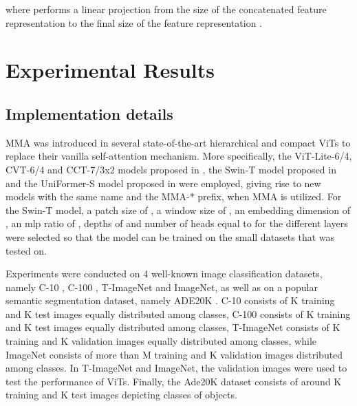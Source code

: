 \documentclass[10pt,twocolumn,letterpaper]{article}
\begin{document}
where  performs a linear projection from the size of the concatenated feature representation  to the final size of the feature representation .

\section{Experimental Results}
\label{sec:results}

\subsection{Implementation details}

MMA was introduced in several state-of-the-art hierarchical and compact ViTs to replace their vanilla self-attention mechanism. More specifically, the ViT-Lite-6/4, CVT-6/4 and CCT-7/3x2 models proposed in \cite{Author1}, the Swin-T model proposed in \cite{Author9} and the UniFormer-S model proposed in \cite{Author57} were employed, giving rise to new models with the same name and the MMA-* prefix, when MMA is utilized. For the Swin-T model, a patch size of , a window size of , an embedding dimension of , an mlp ratio of , depths of  and number of heads equal to  for the different layers were selected so that the model can be trained on the small datasets that was tested on. 

Experiments were conducted on 4 well-known image classification datasets, namely C-10 \cite{Author38}, C-100 \cite{Author38}, T-ImageNet \cite{Author40} and ImageNet, as well as on a popular semantic segmentation dataset, namely ADE20K \cite{Author59, Author60}. C-10 consists of K training and K test images equally distributed among  classes, C-100 consists of K training and K test images equally distributed among  classes, T-ImageNet consists of K training and K validation images equally distributed among  classes, while ImageNet consists of more than M training and K validation images distributed among  classes. In T-ImageNet and ImageNet, the validation images were used to test the performance of ViTs. Finally, the Ade20K dataset consists of around K training and K test images depicting  classes of objects.
\end{document}
